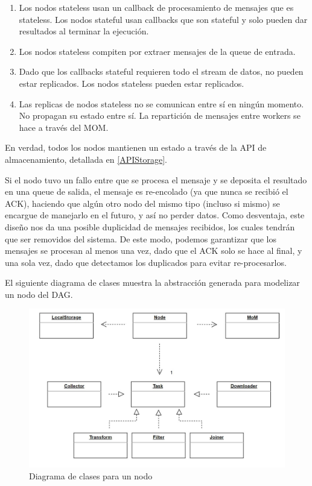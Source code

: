 \documentclass[titlepage,a4paper,oneside]{article}
\begin{document}
\begin{enumerate}
    \item Los nodos stateless usan un callback de procesamiento de mensajes que es stateless. Los nodos stateful usan callbacks que son stateful y solo pueden dar resultados al terminar la ejecución.
    \item Los nodos stateless compiten por extraer mensajes de la queue de entrada.
    \item Dado que los callbacks stateful requieren todo el stream de datos, no pueden estar replicados. Los nodos stateless pueden estar replicados.
    \item Las replicas de nodos stateless no se comunican entre sí en ningún momento. No propagan su estado entre sí. La repartición de mensajes entre workers se hace a través del MOM.
\end{enumerate}

En verdad, todos los nodos mantienen un estado a través de la API de almacenamiento, detallada en \ref{APIStorage}.

Si el nodo tuvo un fallo entre que se procesa el mensaje y se deposita el resultado en una queue de salida, el mensaje es re-encolado (ya que nunca se recibió el ACK), haciendo que algún otro nodo del mismo tipo (incluso si mismo) se encargue de manejarlo en el futuro, y así no perder datos. Como desventaja, este diseño nos da una posible duplicidad de mensajes recibidos, los cuales tendrán que ser removidos del sistema. De este modo, podemos garantizar que los mensajes se procesan al menos una vez, dado que el ACK solo se hace al final, y una sola vez, dado que detectamos los duplicados para evitar re-procesarlos.

El siguiente diagrama de clases muestra la abstracción generada para modelizar un nodo del DAG.

\begin{figure}[H]
	\centering
	\includegraphics[width=14cm]{img/dag_node_class.JPG}
	\caption{Diagrama de clases para un nodo}
\end{figure}
\end{document}
